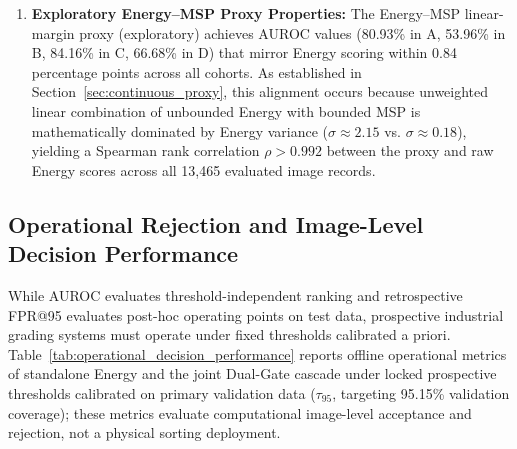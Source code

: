 \begin{enumerate}
\item \textbf{Exploratory Energy--MSP Proxy Properties:} The Energy--MSP linear-margin proxy (exploratory) achieves AUROC values (80.93\% in A, 53.96\% in B, 84.16\% in C, 66.68\% in D) that mirror Energy scoring within 0.84 percentage points across all cohorts. As established in Section~\ref{sec:continuous_proxy}, this alignment occurs because unweighted linear combination of unbounded Energy with bounded MSP is mathematically dominated by Energy variance ($\sigma \approx 2.15$ vs. $\sigma \approx 0.18$), yielding a Spearman rank correlation $\rho > 0.992$ between the proxy and raw Energy scores across all 13,465 evaluated image records.
\end{enumerate}

\vspace*{-4pt}\subsection{Operational Rejection and Image-Level Decision Performance}
\label{sec:results_operational_rejection}

While AUROC evaluates threshold-independent ranking and retrospective FPR@95 evaluates post-hoc operating points on test data, prospective industrial grading systems must operate under fixed thresholds calibrated a priori. Table~\ref{tab:operational_decision_performance} reports offline operational metrics of standalone Energy and the joint Dual-Gate cascade under locked prospective thresholds calibrated on primary validation data ($\tau_{95}$, targeting 95.15\% validation coverage); these metrics evaluate computational image-level acceptance and rejection, not a physical sorting deployment.

